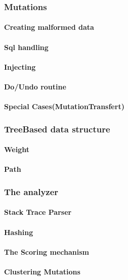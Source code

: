 \documentclass{article}
\begin{document}
  				
			\subsubsection{Mutations}
				\paragraph{Creating malformed data}
				\paragraph{Sql handling}
				\paragraph{Injecting}
				\paragraph{Do/Undo routine}
				\paragraph{Special Cases(MutationTransfert)}
			\subsubsection{TreeBased data structure}
				\paragraph{Weight}
				\paragraph{Path}
			\subsubsection{The analyzer}
				\paragraph{Stack Trace Parser}
				\paragraph{Hashing}
				\paragraph{The Scoring mechanism}
				\paragraph{Clustering Mutations}
\end{document}
